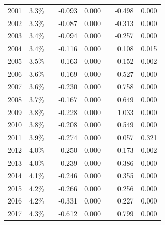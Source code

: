 \begin{table}[H]
\begin{tabular}{lrrrrrrr}
		2001       & 3.3\% &  & -0.093            & 0.000           &  & -0.498           & 0.000          \\
		2002       & 3.3\% &  & -0.087            & 0.000           &  & -0.313           & 0.000          \\
		2003       & 3.4\% &  & -0.094            & 0.000           &  & -0.257           & 0.000          \\
		2004       & 3.4\% &  & -0.116            & 0.000           &  & 0.108            & 0.015          \\
		2005       & 3.5\% &  & -0.163            & 0.000           &  & 0.152            & 0.002          \\
		2006       & 3.6\% &  & -0.169            & 0.000           &  & 0.527            & 0.000          \\
		2007       & 3.6\% &  & -0.230            & 0.000           &  & 0.758            & 0.000          \\
		2008       & 3.7\% &  & -0.167            & 0.000           &  & 0.649            & 0.000          \\
		2009       & 3.8\% &  & -0.228            & 0.000           &  & 1.033            & 0.000          \\
		2010       & 3.8\% &  & -0.208            & 0.000           &  & 0.549            & 0.000          \\
		2011       & 3.9\% &  & -0.274            & 0.000           &  & 0.057            & 0.321          \\
		2012       & 4.0\% &  & -0.250            & 0.000           &  & 0.173            & 0.002          \\
		2013       & 4.0\% &  & -0.239            & 0.000           &  & 0.386            & 0.000          \\
		2014       & 4.1\% &  & -0.246            & 0.000           &  & 0.355            & 0.000          \\
		2015       & 4.2\% &  & -0.266            & 0.000           &  & 0.256            & 0.000          \\
		2016       & 4.2\% &  & -0.331            & 0.000           &  & 0.227            & 0.000          \\
		2017       & 4.3\% &  & -0.612            & 0.000           &  & 0.799            & 0.000 
		\\ \hline
	\end{tabular}
\end{table}

